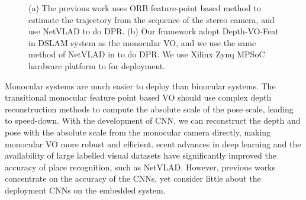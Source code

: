 \begin{figure}[thb]
    \begin{minipage}[t]{0.5\linewidth}  
    \centering
    \end{minipage}
    \begin{minipage}[t]{0.5\linewidth}  
    \centering  
    \end{minipage}
    \caption{(a) The previous work uses ORB feature-point based method to estimate the trajectory from the sequence of the stereo camera, and use NetVLAD \cite{Arandjelovic:2017997} to do DPR. (b) Our framework adopt Depth-VO-Feat \cite{Zhan:2018e92} in DSLAM system as the monocular VO, and we use the same method of NetVLAD in \cite{Cieslewski:20187ee} to do DPR. We use Xilinx Zynq MPSoC hardware platform to for deployment.
    }
\label{fig:overview}
\end{figure}

Monocular systems are much easier to deploy than binocular systems. The transitional monocular feature point based VO should use complex depth reconstruction methods to compute the absolute scale of the pose scale\cite{pizzoli2014remode}, leading to speed-down. With the development of CNN, we can reconstruct the depth and pose with the absolute scale from the monocular camera directly, making monocular VO more robust and efficient\cite{Zhan:2018e92}. ecent advances in deep learning and the availability of large labelled visual datasets have significantly improved the accuracy of place recognition, such as NetVLAD\cite{Arandjelovic:2017997}. However, previous works concentrate on the accuracy of the CNNs, yet consider little about the deployment CNNs on the embedded system.

